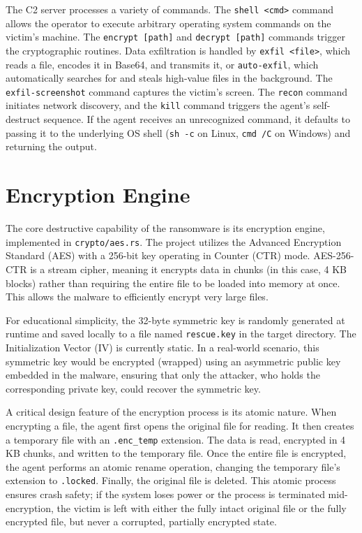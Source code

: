 \documentclass[12pt,a4paper]{article}
\newcommand{\code}[1]{\texttt{\textcolor{primaryblue}{#1}}}
\begin{document}
The C2 server processes a variety of commands. The \code{shell <cmd>} command allows the operator to execute arbitrary operating system commands on the victim's machine. The \code{encrypt [path]} and \code{decrypt [path]} commands trigger the cryptographic routines. Data exfiltration is handled by \code{exfil <file>}, which reads a file, encodes it in Base64, and transmits it, or \code{auto-exfil}, which automatically searches for and steals high-value files in the background. The \code{exfil-screenshot} command captures the victim's screen. The \code{recon} command initiates network discovery, and the \code{kill} command triggers the agent's self-destruct sequence. If the agent receives an unrecognized command, it defaults to passing it to the underlying OS shell (\code{sh -c} on Linux, \code{cmd /C} on Windows) and returning the output.

\section{Encryption Engine}

The core destructive capability of the ransomware is its encryption engine, implemented in \code{crypto/aes.rs}. The project utilizes the Advanced Encryption Standard (AES) with a 256-bit key operating in Counter (CTR) mode. AES-256-CTR is a stream cipher, meaning it encrypts data in chunks (in this case, 4 KB blocks) rather than requiring the entire file to be loaded into memory at once. This allows the malware to efficiently encrypt very large files.

For educational simplicity, the 32-byte symmetric key is randomly generated at runtime and saved locally to a file named \code{rescue.key} in the target directory. The Initialization Vector (IV) is currently static. In a real-world scenario, this symmetric key would be encrypted (wrapped) using an asymmetric public key embedded in the malware, ensuring that only the attacker, who holds the corresponding private key, could recover the symmetric key.

A critical design feature of the encryption process is its atomic nature. When encrypting a file, the agent first opens the original file for reading. It then creates a temporary file with an \code{.enc\_temp} extension. The data is read, encrypted in 4 KB chunks, and written to the temporary file. Once the entire file is encrypted, the agent performs an atomic rename operation, changing the temporary file's extension to \code{.locked}. Finally, the original file is deleted. This atomic process ensures crash safety; if the system loses power or the process is terminated mid-encryption, the victim is left with either the fully intact original file or the fully encrypted file, but never a corrupted, partially encrypted state.
\end{document}
